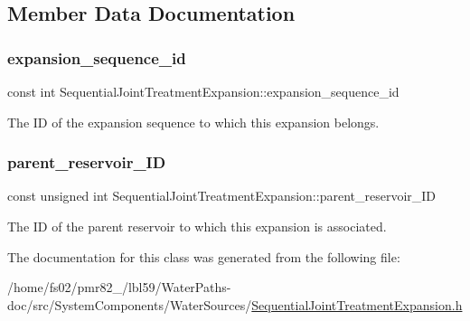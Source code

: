 \subsection{Member Data Documentation}
\mbox{\label{classSequentialJointTreatmentExpansion_adeaf6ba2bcfc4c024e332764144e3021}} 
\subsubsection{\texorpdfstring{expansion\+\_\+sequence\+\_\+id}{expansion\_sequence\_id}}
{\footnotesize\ttfamily const int Sequential\+Joint\+Treatment\+Expansion\+::expansion\+\_\+sequence\+\_\+id}



The ID of the expansion sequence to which this expansion belongs. 

\mbox{\label{classSequentialJointTreatmentExpansion_a43b9e27138606bbbf8e5ef0279232a0a}} 
\subsubsection{\texorpdfstring{parent\+\_\+reservoir\+\_\+\+ID}{parent\_reservoir\_ID}}
{\footnotesize\ttfamily const unsigned int Sequential\+Joint\+Treatment\+Expansion\+::parent\+\_\+reservoir\+\_\+\+ID}



The ID of the parent reservoir to which this expansion is associated. 



The documentation for this class was generated from the following file\+:\begin{DoxyCompactItemize}
\item 
/home/fs02/pmr82\+\_/lbl59/\+Water\+Paths-\/doc/src/\+System\+Components/\+Water\+Sources/\mbox{\hyperlink{SequentialJointTreatmentExpansion_8h}{Sequential\+Joint\+Treatment\+Expansion.\+h}}\end{DoxyCompactItemize}
